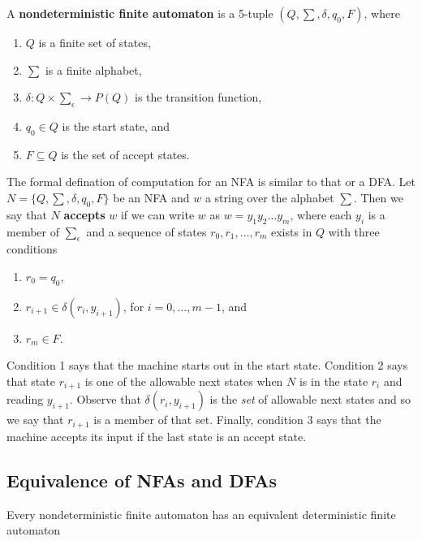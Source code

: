 \begin{defination}
    A \textbf{nondeterministic finite automaton} is a 5-tuple
    $(Q, \sum, \delta, q_0, F)$, where
    \begin{enumerate}
        \item $Q$ is a finite set of states,
        \item $\sum$ is a finite alphabet,
        \item $\delta: Q \times \sum_{\epsilon} \rightarrow P(Q)$ is the 
            transition function,
        \item $q_0 \in Q$ is the start state, and
        \item $F \subseteq Q$ is the set of accept states.
    \end{enumerate}
\end{defination}

The formal defination of computation for an NFA is similar to that or a DFA.
Let $N = \{Q, \sum, \delta, q_0, F\}$ be an NFA and $w$ a string over the 
alphabet $\sum$. Then we say that $N$ \textbf{accepts} $w$ if we can write
$w$ as $w = y_1y_2\dots y_m$, where each $y_i$ is a member of $\sum_{\epsilon}$
and a sequence of states $r_0, r_1, \dots, r_m$ exists in $Q$ with three
conditions
\begin{enumerate}
    \item $r_0 = q_0$,
    \item $r_{i+1} \in \delta(r_i, y_{i+1})$, for $i = 0, \dots, m - 1$, and
    \item $r_m \in F$.
\end{enumerate}

Condition 1 says that the machine starts out in the start state. Condition 2
says that state $r_{i+1}$ is one of the allowable next states when $N$ is
in the state $r_i$ and reading $y_{i+1}$. Observe that $\delta(r_i, y_{i+1})$
is the \textit{set} of allowable next states and so we say that $r_{i+1}$
is a member of that set. Finally, condition 3 says that the machine accepts
its input if the last state is an accept state.

\subsection{Equivalence of NFAs and DFAs}

\begin{theorem}
    Every nondeterministic finite automaton has an equivalent deterministic
    finite automaton
\end{theorem}

